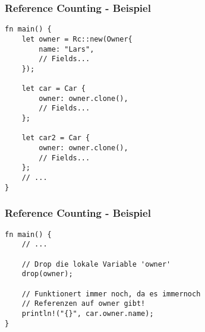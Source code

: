 \documentclass{beamer}
\begin{document}
\begin{frame}[fragile]
	\frametitle{Reference Counting - Beispiel}
	\begin{verbatim}
fn main() {
	let owner = Rc::new(Owner{
		name: "Lars",
		// Fields...
	});

	let car = Car {
		owner: owner.clone(),
		// Fields...
	};

	let car2 = Car {
		owner: owner.clone(),
		// Fields...
	};
	// ...
}
	\end{verbatim}
\end{frame}
\begin{frame}[fragile]
	\frametitle{Reference Counting - Beispiel}
	\begin{verbatim}
fn main() {
	// ...

	// Drop die lokale Variable 'owner'
	drop(owner);

	// Funktionert immer noch, da es immernoch
	// Referenzen auf owner gibt!
	println!("{}", car.owner.name);
}
	\end{verbatim}
\end{frame}
\end{document}
